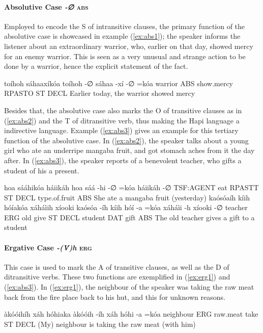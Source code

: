 \documentclass[a4paper, 12pt, oneside]{memoir}
\newcommand{\emh}[1]{\textit{#1}}
\begin{document}
\paragraph{Absolutive Case \emh{-∅} \textsc{abs}}
Employed to encode the S of intransitive clauses, the primary function of the absolutive case is showcased in example (\ref{ex:abs1}); the speaker informs the listener about an extraordinary warrior, who, earlier on that day, showed mercy for an enemy warrior. This is seen as a very unusual and strange action to be done by a warrior, hence the explicit statement of the fact. 
\begin{examples}
\ex \label{ex:abs1}
\words toíhoh sáhaaxíkóa
\bits toíhoh -∅ sáhaa -xí -∅ =kóa 
\gloss warrior ABS show.mercy RPASTO ST  DECL 
\tr Earlier today, the warrior showed mercy
\end{examples}
Besides that, the absolutive case also marks the O of transitive clauses as in (\ref{ex:abs2}) and the T of ditransitive verb, thus making the Hapi language a indirective language. Example (\ref{ex:abs3}) gives an example for this tertiary function of the absolutive case.
In (\ref{ex:abs2}), the speaker talks about a young girl who ate an underripe mangaba fruit, and got stomach aches from it the day after. In (\ref{ex:abs3}), the speaker reports of a benevolent teacher, who gifts a student of his a present.
\begin{examples}
\ex \label{ex:abs2}
\words hoa sááhikóa háiikáh
\bits hoa sáá -hi -∅ =kóa háiikáh -∅ 
\gloss TSF:AGENT eat RPASTT ST DECL type.of.fruit ABS
\tr She ate a mangaba fruit (yesterday)
\ex \label{ex:abs3}
\words kaósóaíh kíih hóíakóa xáháìih xíooki
\bits kaósóa -íh kíih hóí -a =kóa xáháìi -h xíooki -∅
\gloss teacher ERG old give ST DECL student DAT gift ABS
\tr The old teacher gives a gift to a student
\end{examples}
\paragraph{Ergative Case \emh{-(V́)h} \textsc{erg}}
This case is used to mark the A of transitive clauses, as well as the D of ditransitive verbs. These two functions are exemplified in (\ref{ex:erg1}) and (\ref{ex:abs3}).
In (\ref{ex:erg1}), the neighbour of the speaker was taking the raw meat back from the fire place back to his hut, and this for unknown reasons.
\begin{examples}
\ex \label{ex:erg1}
\words àkóóihíh xáh hóhiaka
\bits àkóóih -íh xáh hóhi -a =kóa 
\gloss  neighbour ERG raw.meat take ST DECL 
\tr (My) neighbour is taking the raw meat (with him)
\end{examples}
\end{document}
